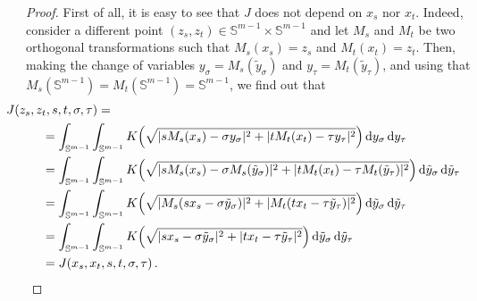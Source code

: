 \documentclass[12pt,reqno]{amsart}
\theoremstyle{definition}
\theoremstyle{remark}
\newcommand{\con}[1]{\mathbb{#1}}
\newcommand{\Sph}{\con{S}} %
\renewcommand{\d}{\,\mathrm{d}} %
\numberwithin{equation}{section}
\begin{document}
\begin{proof}
	First of all, it is easy to see that $J$ does not depend on $x_s$ nor $x_t$. Indeed, consider a different point $(z_s, z_t)\in \Sph^{m-1} \times \Sph^{m-1}$ and let $M_s$ and $M_t$ be two orthogonal transformations such that $M_s(x_s) = z_s$ and $M_t(x_t) = z_t$. Then, making the change of variables $y_\sigma = M_s(\tilde{y}_\sigma)$ and $y_\tau = M_t(\tilde{y}_\tau)$, and using that $M_s( \Sph^{m-1}) = M_t(\Sph^{m-1}) = \Sph^{m-1}$, we find out that
	\begin{align*}
	& \hspace{-1cm} J(z_s, z_t, s,t,\sigma, \tau) = \\
	&= \int_{\Sph^{m-1}}  \int_{\Sph^{m-1}} K \Big( \sqrt{|s M_s(x_s) - \sigma y_\sigma|^2 + |t M_t(x_t) - \tau y_\tau|^2 }\Big) \d y_\sigma \d y_\tau \\
	&= \int_{\Sph^{m-1}}  \int_{\Sph^{m-1}} K \Big( \sqrt{|s M_s(x_s) - \sigma M_s(\tilde{y}_\sigma)|^2 + |t M_t(x_t) - \tau M_t(\tilde{y}_\tau)|^2 }\Big) \d \tilde{y}_\sigma \d \tilde{y}_\tau \\
	&= \int_{\Sph^{m-1}}  \int_{\Sph^{m-1}} K\Big ( \sqrt{|M_s(sx_s - \sigma \tilde{y}_\sigma)|^2 + |M_t(t x_t - \tau \tilde{y}_\tau)|^2 }\Big) \d \tilde{y}_\sigma \d \tilde{y}_\tau \\
	&= \int_{\Sph^{m-1}}  \int_{\Sph^{m-1}} K\Big ( \sqrt{|sx_s - \sigma \tilde{y}_\sigma|^2 + |t x_t - \tau \tilde{y}_\tau|^2 }\Big) \d \tilde{y}_\sigma \d \tilde{y}_\tau \\
	&= J(x_s, x_t, s,t,\sigma, \tau) \,.
	\end{align*}
	

\end{proof}
\end{document}

